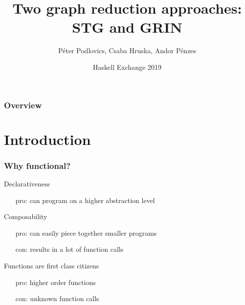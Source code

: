 \documentclass[bigger]{beamer}
\title[STG vs GRIN] %
{Two graph reduction approaches: STG and GRIN}
\author[P. Podlovics, Cs. Hruska, Andor Pénzes ] %
{Péter Podlovics, Csaba Hruska, Andor Pénzes}
\institute[ELTE] %
{
	Eötvös Loránd University (ELTE), \\ Budapest, Hungary
}
\date{Haskell Exchange 2019} %
\begin{document}
	
{
	\frame{\vspace{15mm}\titlepage}
}

\begin{frame}
	\frametitle{Overview}
	\tableofcontents
\end{frame}


\section{Introduction}

\begin{frame}[fragile]
	\frametitle{Why functional?}
	
	\begin{vfitemize}
		\item Declarativeness
			\begin{itemize}
				\item[pro:] can program on a higher abstraction level
			\end{itemize}
		\item Composability\\
			\begin{itemize}
				\item[pro:] can easily piece together smaller programs
				\item[con:] results in a lot of function calls
			\end{itemize}
		\item Functions are first class citizens
			\begin{itemize}
				\item[pro:] higher order functions
				\item[con:] unknown function calls
			\end{itemize}
	\end{vfitemize}

\end{frame}
\end{document}
